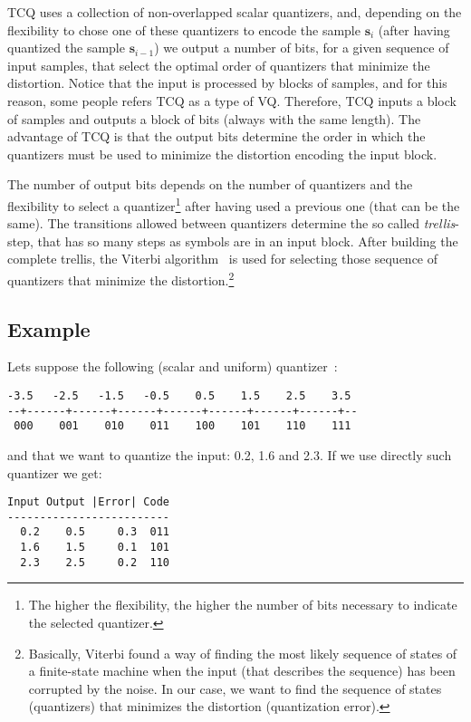 TCQ uses a collection of non-overlapped scalar quantizers, and,
depending on the flexibility to chose one of these quantizers to
encode the sample ${\mathbf s}_i$ (after having quantized the sample
${\mathbf s}_{i-1}$) we output a number of bits, for a given sequence
of input samples, that select the optimal order of quantizers that
minimize the distortion. Notice that the input is processed by blocks
of samples, and for this reason, some people refers TCQ as a type of
VQ. Therefore, TCQ inputs a block of samples and outputs a block of
bits (always with the same length). The advantage of TCQ is that the
output bits determine the order in which the quantizers must be used
to minimize the distortion encoding the input block.

The number of output bits depends on the number of quantizers and the
flexibility to select a quantizer\footnote{The higher the flexibility,
the higher the number of bits necessary to indicate the selected
quantizer.} after having used a previous one (that can be the
same). The transitions allowed between quantizers determine the so
called \emph{trellis}-step, that has so many steps as symbols are in
an input block. After building the complete trellis, the Viterbi
algorithm~\cite{} is used for selecting those sequence of quantizers
that minimize the distortion.\footnote{Basically, Viterbi found a way
of finding the most likely sequence of states of a finite-state
machine when the input (that describes the sequence) has been
corrupted by the noise. In our case, we want to find the sequence of
states (quantizers) that minimizes the distortion (quantization
error).}

\subsection*{Example}
Lets suppose the following (scalar and uniform) quantizer~\cite{}:

\begin{verbatim}
-3.5   -2.5   -1.5   -0.5    0.5    1.5    2.5    3.5
--+------+------+------+------+------+------+------+--
 000    001    010    011    100    101    110    111
\end{verbatim}

and that we want to quantize the input: 0.2, 1.6 and 2.3. If we use
directly such quantizer we get:

\begin{verbatim}
Input Output |Error| Code
-------------------------
  0.2    0.5     0.3  011
  1.6    1.5     0.1  101
  2.3    2.5     0.2  110
\end{verbatim}

